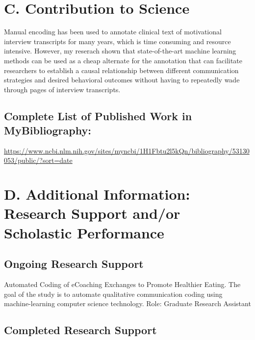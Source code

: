 \documentclass{nihbiosketch}
\begin{document}

\section{C. Contribution to Science}

\begin{enumerate}

Manual encoding has been used to annotate clinical text of motivational interview transcripts for many years, which is time consuming and resource intensive. However, my reserach shown that state-of-the-art machine learning methods can be used as a cheap alternate for the annotation that can facilitate researchers to establish a causal relationship between different communication strategies and desired behavioral outcomes without having to repeatedly wade through pages of interview transcripts.

\end{enumerate}

\subsection*{Complete List of Published Work in MyBibliography:} 
\url{https://www.ncbi.nlm.nih.gov/sites/myncbi/1H1Fbtu2l5kQn/bibliography/53130053/public/?sort=date}


\section{D. Additional Information: Research Support and/or Scholastic Performance}

\subsection*{Ongoing Research Support}

{Automated Coding of eCoaching Exchanges to Promote Healthier Eating.}
{The goal of the study is to automate qualitative communication coding using machine-learning computer science technology.}
{Role: Graduate Research Assistant}


\subsection*{Completed Research Support}
\end{document}
